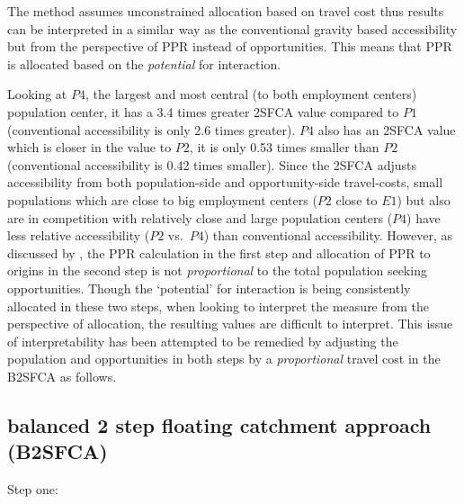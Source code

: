 \documentclass[]{elsarticle} %
\begin{document}
The method assumes unconstrained allocation based on travel cost thus
results can be interpreted in a similar way as the conventional gravity
based accessibility but from the perspective of PPR instead of
opportunities. This means that PPR is allocated based on the
\emph{potential} for interaction.

Looking at \(P4\), the largest and most central (to both employment
centers) population center, it has a 3.4 times greater 2SFCA value
compared to \(P1\) (conventional accessibility is only 2.6 times
greater). \(P4\) also has an 2SFCA value which is closer in the value to
\(P2\), it is only 0.53 times smaller than \(P2\) (conventional
accessibility is 0.42 times smaller). Since the 2SFCA adjusts
accessibility from both population-side and opportunity-side
travel-costs, small populations which are close to big employment
centers (\(P2\) close to \(E1\)) but also are in competition with
relatively close and large population centers (\(P4\)) have less
relative accessibility (\(P2\) vs.~\(P4\)) than conventional
accessibility. However, as discussed by \citet{paez2019}, the PPR
calculation in the first step and allocation of PPR to origins in the
second step is not \emph{proportional} to the total population seeking
opportunities. Though the `potential' for interaction is being
consistently allocated in these two steps, when looking to interpret the
measure from the perspective of allocation, the resulting values are
difficult to interpret. This issue of interpretability has been
attempted to be remedied by adjusting the population and opportunities
in both steps by a \emph{proportional} travel cost in the B2SFCA as
follows.

\hypertarget{balanced-2-step-floating-catchment-approach-b2sfca}{%
\subsection{balanced 2 step floating catchment approach
(B2SFCA)}\label{balanced-2-step-floating-catchment-approach-b2sfca}}

Step one:
\end{document}
